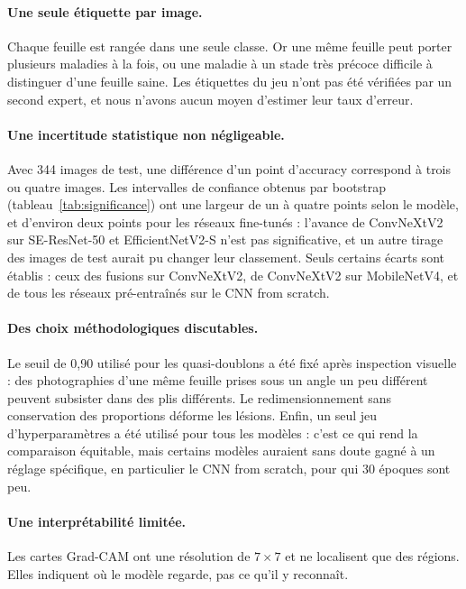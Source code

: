 \paragraph{Une seule étiquette par image.} Chaque feuille est rangée dans une seule classe. Or une même feuille peut porter plusieurs maladies à la fois, ou une maladie à un stade très précoce difficile à distinguer d'une feuille saine. Les étiquettes du jeu n'ont pas été vérifiées par un second expert, et nous n'avons aucun moyen d'estimer leur taux d'erreur.

\paragraph{Une incertitude statistique non négligeable.} Avec 344 images de test, une différence d'un point d'accuracy correspond à trois ou quatre images. Les intervalles de confiance obtenus par bootstrap (tableau~\ref{tab:significance}) ont une largeur de un à quatre points selon le modèle, et d'environ deux points pour les réseaux fine-tunés : l'avance de ConvNeXtV2 sur SE-ResNet-50 et EfficientNetV2-S n'est pas significative, et un autre tirage des images de test aurait pu changer leur classement. Seuls certains écarts sont établis : ceux des fusions sur ConvNeXtV2, de ConvNeXtV2 sur MobileNetV4, et de tous les réseaux pré-entraînés sur le CNN from scratch.

\paragraph{Des choix méthodologiques discutables.} Le seuil de 0,90 utilisé pour les quasi-doublons a été fixé après inspection visuelle : des photographies d'une même feuille prises sous un angle un peu différent peuvent subsister dans des plis différents. Le redimensionnement sans conservation des proportions déforme les lésions. Enfin, un seul jeu d'hyperparamètres a été utilisé pour tous les modèles : c'est ce qui rend la comparaison équitable, mais certains modèles auraient sans doute gagné à un réglage spécifique, en particulier le CNN from scratch, pour qui 30 époques sont peu.

\paragraph{Une interprétabilité limitée.} Les cartes Grad-CAM ont une résolution de $7\times7$ et ne localisent que des régions. Elles indiquent où le modèle regarde, pas ce qu'il y reconnaît.

